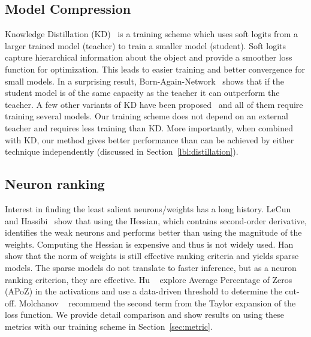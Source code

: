 \subsection{Model Compression } 
Knowledge Distillation (KD)~\cite{Hinton2015DistillingTK} is a training scheme which uses soft logits from a larger trained model (teacher) to train a smaller model (student).
Soft logits capture hierarchical information about the object and provide a smoother loss function for optimization. This leads to easier training and better convergence for small models.
In a surprising result, Born-Again-Network~\cite{Furlanello2018BornAN} shows that if the student model is of the same capacity as the teacher it can outperform the teacher.
A few other variants of KD have been proposed~\cite{Romero2014FitNetsHF} and all of them require training several models.
Our training scheme does not depend on an external teacher and requires less training than KD. %
More importantly, when combined with KD, our method gives better performance than can be achieved by either technique independently (discussed in Section~\ref{lbl:distillation}).


\subsection{Neuron ranking } 
Interest in finding the least salient neurons/weights has a long history. 
LeCun~\cite{LeCun1989OptimalBD} and Hassibi\etal~\cite{Hassibi1992SecondOD} show that using the Hessian, which contains second-order derivative, identifies the weak neurons and performs better than using the magnitude of the weights.
Computing the Hessian is expensive and thus is not widely used.
Han \etal~\cite{Han2015DeepCC} show that the norm of weights is still effective ranking criteria and yields sparse models.
The sparse models do not translate to faster inference, but as a neuron ranking criterion, they are effective.
Hu \etal~\cite{Hu2016NetworkTA} explore Average Percentage of Zeros (APoZ) in the activations and use a data-driven threshold to determine the cut-off. 
Molchanov \etal~\cite{Molchanov2016PruningCN} recommend the second term from the Taylor expansion of the loss function.%
We provide detail comparison and show results on using these metrics with our training scheme in Section~\ref{sec:metric}.

